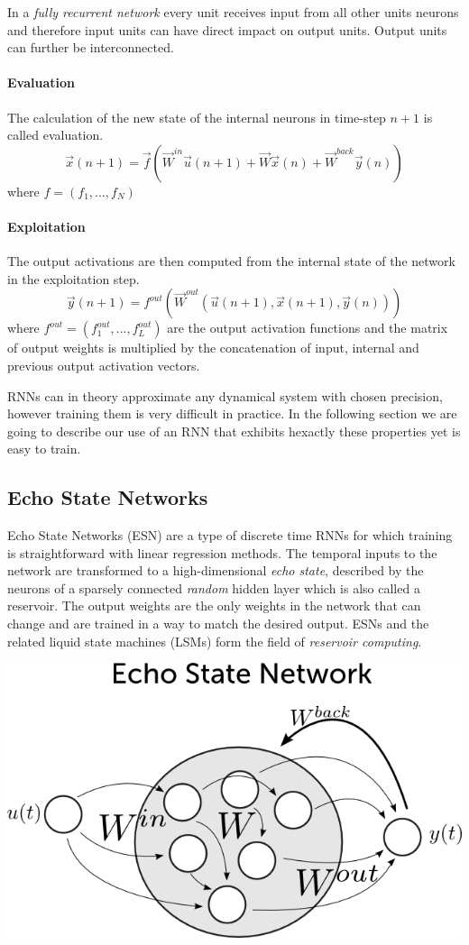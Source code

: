 In a \emph{fully recurrent network} every unit receives input from all other units neurons and therefore input units can have direct impact on output units. Output units can further be interconnected.\par

\paragraph{Evaluation}
The calculation of the new state of the internal neurons in time-step $n+1$ is called evaluation. 
\[
\vec{x}(n+1)=\vec{f}(\vec{W}^{in}\vec{u}(n+1)+\vec{W}\vec{x}(n)+\vec{W}^{back}\vec{y}(n))
\]
where $f=(f_1,...,f_N)$
\paragraph{Exploitation}
The output activations are then computed from the internal state of the network in the exploitation step.
\[
\vec{y}(n+1)=f^{out}(\vec{W}^{out}(\vec{u}(n+1),\vec{x}(n+1),\vec{y}(n)))
\]
where $f^{out}=(f^{out}_1,...,f^{out}_L)$ are the output activation functions and the matrix of output weights is multiplied by the concatenation of input, internal and previous output activation vectors.\par
RNNs can in theory approximate any dynamical system with chosen precision, however training them is very difficult in practice. In the following section we are going to describe our use of an RNN that exhibits hexactly these properties yet is easy to train.

\subsection*{Echo State Networks}
Echo State Networks (ESN) are a type of discrete time RNNs for which training is straightforward with linear regression methods.  The temporal inputs to the network are transformed to a high-dimensional \emph{echo state}, described by the neurons of a sparsely connected \emph{random} hidden layer which is also called a reservoir. The output weights are the only weights in the network that can change and are trained in a way to match the desired output. ESNs and the related liquid state machines (LSMs) form the field of \emph{reservoir computing}.

\includegraphics[width=.7\textwidth]{./img/simple_esn.png}

